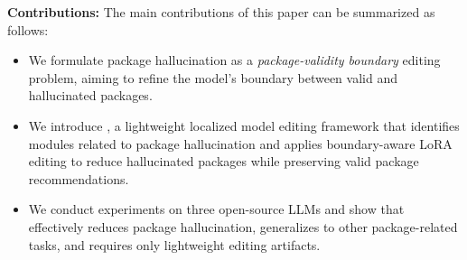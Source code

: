 \noindent\textbf{Contributions:} The main contributions of this paper can be summarized as follows:
\begin{itemize}[leftmargin=*]
    \item We formulate package hallucination as a \emph{package-validity boundary} editing problem, aiming to refine the model's boundary between valid and hallucinated packages.
    \item We introduce \textbf{\appname}, a lightweight localized model editing framework that identifies modules related to package hallucination and applies boundary-aware LoRA editing to reduce hallucinated packages while preserving valid package recommendations.
    \item We conduct experiments on three open-source LLMs and show that \appname effectively reduces package hallucination, generalizes to other package-related tasks, and requires only lightweight editing artifacts.
\end{itemize}

